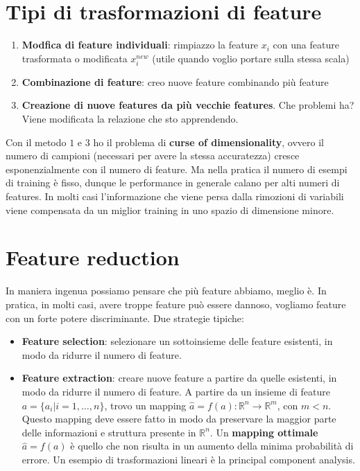 \documentclass{../main.tex}[subfiles]
\begin{document}
\section{Tipi di trasformazioni di feature}
\begin{enumerate}
	\item \textbf{Modfica di feature individuali}: rimpiazzo la feature $x_i$ con una feature trasformata o modificata $x_i^{new}$ (utile quando voglio portare sulla stessa scala)
	\item \textbf{Combinazione di feature}: creo nuove feature combinando più feature 
	\item \textbf{Creazione di nuove features da più vecchie features}. Che problemi ha? Viene modificata la relazione che sto apprendendo. 
\end{enumerate}
Con il metodo $1$ e $3$ ho il problema di \textbf{curse of dimensionality}, ovvero il numero di campioni (necessari per avere la stessa accuratezza) cresce esponenzialmente con il numero di feature. Ma nella pratica il numero di esempi di training è fisso, dunque le performance in generale calano per alti numeri di features.
In molti casi l'informazione che viene persa dalla rimozioni di variabili viene compensata da un miglior training in uno spazio di dimensione minore.
\section{Feature reduction}
In maniera ingenua possiamo pensare che più feature abbiamo, meglio è. In pratica, in molti casi, avere troppe feature può essere dannoso, vogliamo feature con un forte potere discriminante.
Due strategie tipiche:
\begin{itemize}
	\item \textbf{Feature selection}: selezionare un sottoinsieme delle feature esistenti, in modo da ridurre il numero di feature.
	\item \textbf{Feature extraction}: creare nuove feature a partire da quelle esistenti, in modo da ridurre il numero di feature.
	A partire da un insieme di feature $a=\{a_i|i=1,\ldots,n\}$, trovo un mapping $\hat{a}=f(a):\mathbb{R}^n\rightarrow\mathbb{R}^m$, con $m<n$.
	Questo mapping deve essere fatto in modo da preservare la maggior parte delle informazioni e struttura presente in $\mathbb{R}^n$.
	Un \textbf{mapping ottimale} $\hat{a}=f(a)$ è quello che non risulta in un aumento della minima probabilità di errore. Un esempio di trasformazioni lineari è la principal component analysis.
\end{itemize}
\end{document}
